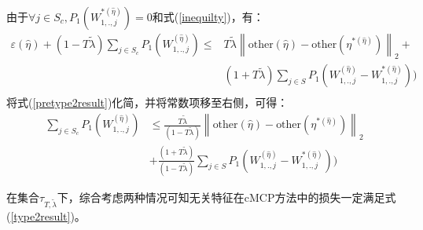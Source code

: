 \documentclass{article}
\begin{document}
\begin{itemize}
\begin{equation}
\begin{split}
		\end{split}
	\end{equation}
	由于$\forall j\in S_c,P_1(W_{1,.,j}^{*(\hat{\eta})})=0$和式(\ref*{inequilty})，有：
	\begin{equation}\label{pretype2result}
		\begin{split}
		    \varepsilon(\hat{\eta})+(1-T\tilde{\lambda})\sum_{j\in S_c}P_1(W_{1,.,j}^{(\hat{\eta})})\leq &T\tilde{\lambda}\left\|\text{other}(\hat{\eta})-\text{other}(\eta^{*(\hat{\eta})})\right\|_2+\\&(1+T\tilde{\lambda})\sum_{j\in S}P_1(W_{1,.,j}^{(\hat{\eta})}-W_{1,.,j}^{*(\hat{\eta})}))\\
		\end{split}
	\end{equation}
	将式(\ref*{pretype2result})化简，并将常数项移至右侧，可得：
	\begin{equation}\label{type2result}
		\begin{split}
			\sum_{j\in S_c}P_1(W_{1,.,j}^{(\hat{\eta})})&\leq \frac{T\tilde{\lambda}}{(1-T\tilde{\lambda})}\left\|\text{other}(\hat{\eta})-\text{other}(\eta^{*(\hat{\eta})})\right\|_2\\&+\frac{(1+T\tilde{\lambda})}{(1-T\tilde{\lambda})}\sum_{j\in S}P_1(W_{1,.,j}^{(\hat{\eta})}-W_{1,.,j}^{*(\hat{\eta})}))	
		\end{split}
	\end{equation}
\end{itemize}
\par 在集合$\tau_{T,\tilde{\lambda}}$下，综合考虑两种情况可知无关特征在cMCP方法中的损失一定满足式(\ref*{type2result})。
\end{document}
